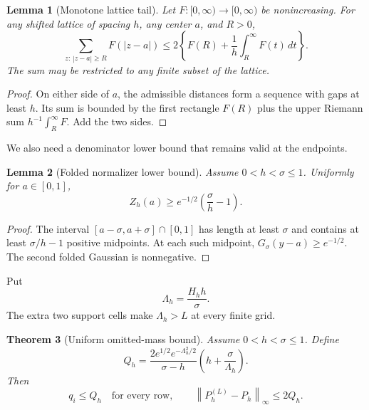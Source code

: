 \documentclass[11pt]{article}
\newtheorem{theorem}{Theorem}[section]
\newtheorem{lemma}[theorem]{Lemma}
\theoremstyle{definition}
\theoremstyle{remark}
\newcommand{\norm}[1]{\left\lVert #1\right\rVert}
\begin{document}
\begin{lemma}[Monotone lattice tail]
\label{lem:lattice-tail}
Let $F:[0,\infty)\to[0,\infty)$ be nonincreasing.  For any shifted lattice of
spacing $h$, any center $a$, and $R>0$,
\begin{equation}
\sum_{z:\,|z-a|\ge R}F(|z-a|)
\le2\left\{F(R)+\frac1h\int_R^\infty F(t)\,dt\right\}.
\label{eq:lattice-tail}
\end{equation}
The sum may be restricted to any finite subset of the lattice.
\end{lemma}

\begin{proof}
On either side of $a$, the admissible distances form a sequence with gaps at
least $h$.  Its sum is bounded by the first rectangle $F(R)$ plus the upper
Riemann sum $h^{-1}\int_R^\infty F$.  Add the two sides.
\end{proof}

We also need a denominator lower bound that remains valid at the endpoints.

\begin{lemma}[Folded normalizer lower bound]
\label{lem:normalizer}
Assume $0<h<\sigma\le1$.  Uniformly for $a\in[0,1]$,
\begin{equation}
Z_h(a)\ge e^{-1/2}\left(\frac\sigma h-1\right).
\label{eq:normalizer-lower}
\end{equation}
\end{lemma}

\begin{proof}
The interval $[a-\sigma,a+\sigma]\cap[0,1]$ has length at least $\sigma$ and
contains at least $\sigma/h-1$ positive midpoints.  At each such midpoint,
$G_\sigma(y-a)\ge e^{-1/2}$.  The second folded Gaussian is nonnegative.
\end{proof}

Put
\begin{equation}
\Lambda_h=\frac{H_hh}{\sigma}.
\label{eq:effective-multiple}
\end{equation}
The extra two support cells make $\Lambda_h>L$ at every finite grid.

\begin{theorem}[Uniform omitted-mass bound]
\label{thm:row-tail}
Assume $0<h<\sigma\le1$.  Define
\begin{equation}
Q_h=
\frac{2e^{1/2}e^{-\Lambda_h^2/2}}
     {\sigma-h}
\left(h+\frac{\sigma}{\Lambda_h}\right).
\label{eq:Q-bound}
\end{equation}
Then
\begin{equation}
q_i\le Q_h
\quad\text{for every row},
\qquad
\norm{P_h^{(L)}-P_h}_\infty\le2Q_h.
\label{eq:row-tail-result}
\end{equation}
\end{theorem}
\end{document}
